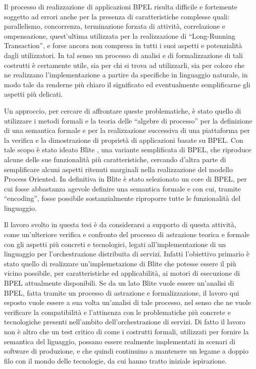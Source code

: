 Il processo di realizzazione di applicazioni BPEL risulta difficile e fortemente
soggetto ad errori anche per la presenza di caratteristiche complesse quali:
parallelismo, concorrenza, terminazione forzata di attività, correlazione e
ompensazione, quest'ultima utilizzata per la realizzazione di ``Long-Running
Transaction'', e forse ancora non compresa in tutti i suoi aspetti e potenzialità
dagli utilizzatori. In tal senso un processo di analisi e di
formalizzazione di tali costrutti è certamente utile, sia per chi si trova ad
utilizzarli, sia per coloro che ne realizzano l'implementazione a partire da
specifiche in linguaggio naturale, in modo tale da renderne più chiaro il
significato ed eventualmente semplificarne gli aspetti più delicati.

Un approccio, per cercare di affrontare queste problematiche, è stato quello di
utilizzare i metodi formali e la teoria delle ``algebre di processo'' per la
definizione di una semantica formale e per la realizzazione successiva di una
piattaforma per la verifica e la dimostrazione di proprietà di applicazioni
basate su BPEL. Con tale scopo è stato ideato Blite \cite{LaPuTie1}, una
variante semplificata di BPEL, che riproduce alcune delle sue funzionalità più
caratteristiche, cercando d'altra parte di semplificare alcuni aspetti ritenuti
marginali nella realizzazione del modello Process Oriented. In definitiva in
Blite è stato selezionato un core di BPEL, per cui fosse abbastanza agevole
definire una semantica formale e con cui, tramite ``encoding'', fosse possibile
sostanzialmente riproporre tutte le funzionalità del linguaggio.

Il lavoro svolto in questa tesi è da considerarsi a supporto di questa attività,
come un'ulteriore verifica e confronto del processo di astrazione teorica e
formale con gli aspetti più concreti e tecnologici, legati all'implementazione di
un linguaggio per l'orchestrazione distribuita di servizi. Infatti l'obiettivo
primario è stato quello di realizzare un'implemetazione di Blite che potesse
essere il più vicino possibile, per caratteristiche ed applicabilità, ai motori
di esecuzione di BPEL attualmente disponibili. Se da un lato Blite vuole essere
un'analisi di BPEL, fatta tramite un processo di astrazione e formalizzazione,
il lavoro qui esposto vuole essere a sua volta un'analisi di tale processo, nel
senso che ne vuole verificare la compatibilità e l'attinenza con le problematiche
più concrete e tecnologiche presenti nell'ambito dell'orchestrazione di servizi.
Di fatto il lavoro non è altro che un test critico di come i costrutti formali,
utilizzati per fornire la semantica del liguaggio, possano essere realmente
implementati in scenari di software di produzione, e che quindi continuino a
mantenere un legame a doppio filo con il mondo delle tecnologie, da cui hanno
tratto iniziale ispirazione. 


